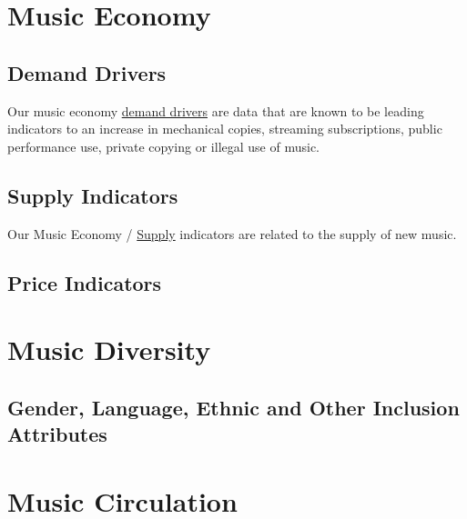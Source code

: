 \documentclass[
  a4paper,
  openany, a4paper, oneside]{book}
\begin{document}
\hypertarget{music-economy}{%
\section{Music Economy}\label{music-economy}}

\hypertarget{demand-drivers}{%
\subsection{Demand Drivers}\label{demand-drivers}}

Our music economy \href{https://data.music.dataobservatory.eu/music-economy.html}{demand drivers} are data that are known to be leading indicators to an increase in mechanical copies, streaming subscriptions, public performance use, private copying or illegal use of music.

\hypertarget{supply-indicators}{%
\subsection{Supply Indicators}\label{supply-indicators}}

Our Music Economy / \href{https://data.music.dataobservatory.eu/music-economy.html\#supply}{Supply} indicators are related to the supply of new music.

\hypertarget{price-indicators}{%
\subsection{Price Indicators}\label{price-indicators}}

\hypertarget{music-diversity}{%
\section{Music Diversity}\label{music-diversity}}

\hypertarget{gender-language-ethnic-and-other-inclusion-attributes}{%
\subsection{Gender, Language, Ethnic and Other Inclusion Attributes}\label{gender-language-ethnic-and-other-inclusion-attributes}}

\hypertarget{music-circulation}{%
\section{Music Circulation}\label{music-circulation}}
\end{document}
